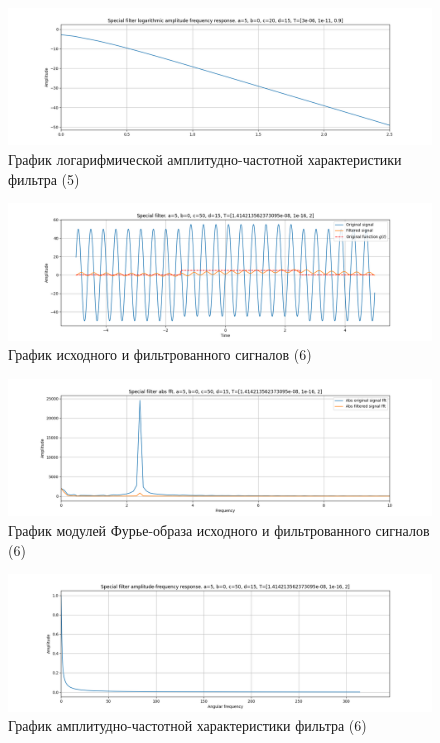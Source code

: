 \documentclass[a4paper, 12pt]{article}
\begin{document}
    \begin{figure}[H]
        \centering
        \includegraphics[scale=0.4]{5_fl2_lafr.png}
        \captionsetup{skip=0pt}
        \caption{График логарифмической амплитудно-частотной характеристики фильтра (5)}
        \label{fig:filinlafr25}
    \end{figure}
    \begin{figure}[H]
        \centering
        \includegraphics[scale=0.4]{6_fl2.png}
        \captionsetup{skip=0pt}
        \caption{График исходного и фильтрованного сигналов (6)}
        \label{fig:filin26}
    \end{figure}
    \begin{figure}[H]
        \centering
        \includegraphics[scale=0.4]{6_fl2_abs.png}
        \captionsetup{skip=0pt}
        \caption{График модулей Фурье-образа исходного и фильтрованного сигналов (6)}
        \label{fig:filinabs26}
    \end{figure}
    \begin{figure}[H]
        \centering
        \includegraphics[scale=0.4]{6_fl2_afr.png}
        \captionsetup{skip=0pt}
        \caption{График амплитудно-частотной характеристики фильтра (6)}
        \label{fig:filinafr26}
    \end{figure}
\end{document}
